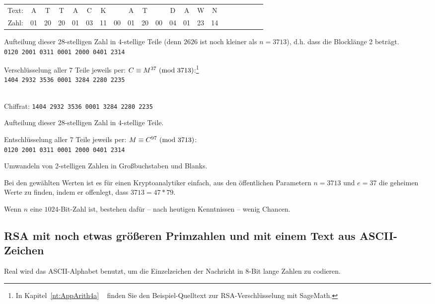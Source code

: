 \begin{refsegment}
\\
{\tt
\begin{tabular}{rcccccccccccccccccccc}
{\rm Text:} & A & T & T & A & C & K & & A & T &  & D & A & W & N\\
{\rm Zahl:} & 01 & 20 & 20 & 01 & 03 & 11 & 00 & 01 & 20 & 00 & 04 & 01 & 23 & 14
\end{tabular}
}

\noindent Aufteilung dieser 28-stelligen Zahl in 4-stellige Teile (denn $2626$ ist noch kleiner als $n=3713$), d.h. dass
die Blocklänge 2 beträgt.\\
{\tt 0120 2001 0311 0001 2000 0401 2314}

\label{SrcArith4a}
\noindent Verschlüsselung aller 7 Teile jeweils per: $C \equiv M^{37}{\rm ~(mod~3713)}$:\footnote{%
  In Kapitel~\ref{nt:AppArith4a} \glqq {}\grqq~
  finden Sie den Beispiel-Quelltext zur RSA-Verschlüsselung mit SageMath.
}\\
{\tt 1404 2932 3536 0001 3284 2280 2235}

\\
Chiffrat: {\tt 1404 2932 3536 0001 3284 2280 2235 }

\noindent Aufteilung dieser 28-stelligen Zahl in 4-stellige Teile.

\noindent Entschlüsselung aller $7$ Teile jeweils per: $M \equiv C^{97}{\rm ~(mod~}3713)$:\\
{\tt 0120 2001 0311 0001 2000 0401 2314}

\noindent Umwandeln von 2-stelligen Zahlen in Großbuchstaben und Blanks.

\noindent Bei den gewählten Werten ist es für einen Kryptoanalytiker
 einfach, aus den öffentlichen Parametern
$n=3713$ und $e=37$ die geheimen Werte zu finden, indem
er offenlegt, dass $3713 = 47 * 79$.

\noindent Wenn $n$ eine $1024$-Bit-Zahl ist, bestehen dafür -- nach heutigen
Kenntnissen -- wenig Chancen.


\subsection[RSA mit noch etwas größeren Primzahlen und ASCII-Zeichen]
           {RSA mit noch etwas größeren Primzahlen und mit einem Text aus ASCII-Zeichen}

Real wird das ASCII-Alphabet benutzt, um die Einzelzeichen der Nachricht in
8-Bit lange Zahlen zu codieren.


\end{refsegment}

